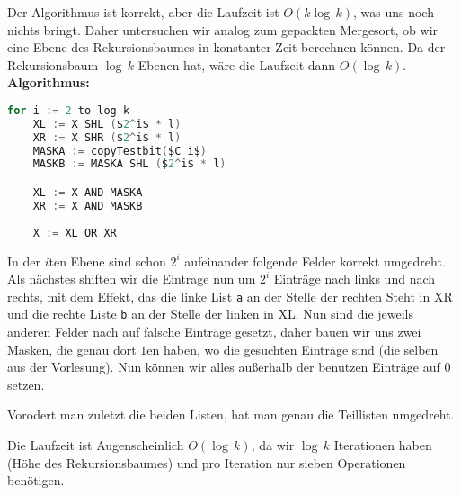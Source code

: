 \documentclass[11pt,a4paper,ngerman]{article}
\begin{document}
Der Algorithmus ist korrekt, aber die Laufzeit ist $O(k \log \, k)$, was uns noch nichts bringt. Daher untersuchen wir analog zum gepackten Mergesort,
ob wir eine Ebene des Rekursionsbaumes in konstanter Zeit berechnen können. Da der Rekursionsbaum $\log \, k$ Ebenen hat, wäre die Laufzeit dann $O(\log \, k)$.\\

\noindent\textbf{Algorithmus:}
\begin{lstlisting}[frame=single,language=C, morekeywords={:=,SHR,SHL,NOT,XOR,AND,OR,MUL}]
for i := 2 to log k
	XL := X SHL ($2^i$ * l)
	XR := X SHR ($2^i$ * l)
	MASKA := copyTestbit($C_i$)
	MASKB := MASKA SHL ($2^i$ * l)

	XL := X AND MASKA
	XR := X AND MASKB
	
	X := XL OR XR
\end{lstlisting}

In der $i$ten Ebene sind schon $2^i$ aufeinander folgende Felder korrekt umgedreht. Als nächstes shiften wir die Eintrage nun um $2^i$ Einträge nach links und nach rechts, mit dem Effekt, das die linke List \lstinline|a| an der Stelle der rechten Steht in XR und die rechte Liste \lstinline|b| an der Stelle der linken in XL. Nun sind die jeweils anderen Felder nach auf falsche Einträge gesetzt, daher bauen wir uns zwei Masken, die genau dort
$1$en haben, wo die gesuchten Einträge sind (die selben aus der Vorlesung). Nun können wir alles außerhalb der benutzen Einträge auf $0$ setzen.

Vorodert man zuletzt die beiden Listen, hat man genau die Teillisten umgedreht.

Die Laufzeit ist Augenscheinlich $O(\log \, k)$, da wir $\log \, k$ Iterationen haben (Höhe des Rekursionsbaumes) und pro Iteration nur sieben Operationen benötigen.

\label{LastPage}
\end{document}
